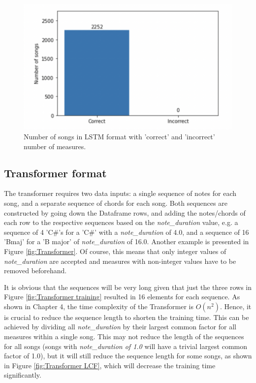 \begin{figure}
    \centering
    \includegraphics{Figures/LSTM check}
    \decoRule
    \caption{Number of songs in LSTM format with 'correct' and 'incorrect' number of measures.}
    \label{fig:LSTM check}
    \end{figure}

\subsection{Transformer format}
The transformer requires two data inputs: a single sequence of notes for each song, and a separate sequence of chords for each song. Both sequences are constructed by going down the Dataframe rows, and adding the notes/chords of each row to the respective sequences based on the \emph{note\_duration} value, e.g. a sequence of 4 'C\#'s for a 'C\#' with a \emph{note\_duration} of 4.0, and a sequence of 16 'Bmaj' for a 'B major' of \emph{note\_duration} of 16.0. Another example is presented in Figure \ref{fig:Transformer}. Of course, this means that only integer values of \emph{note\_duration} are accepted and measures with non-integer values have to be removed beforehand.

It is obvious that the sequences will be very long given that just the three rows in Figure \ref{fig:Transformer training} resulted in 16 elements for each sequence. As shown in Chapter 4, the time complexity of the Transformer is $O({n}^2)$. Hence, it is crucial to reduce the sequence length to shorten the training time. This can be achieved by dividing all \emph{note\_duration} by their largest common factor for all measures within a single song. This may not reduce the length of the sequences for all songs (songs with \emph{note\_duration of 1.0} will have a trivial largest common factor of 1.0), but it will still reduce the sequence length for some songs, as shown in Figure \ref{fig:Transformer LCF}, which will decrease the training time significantly.


